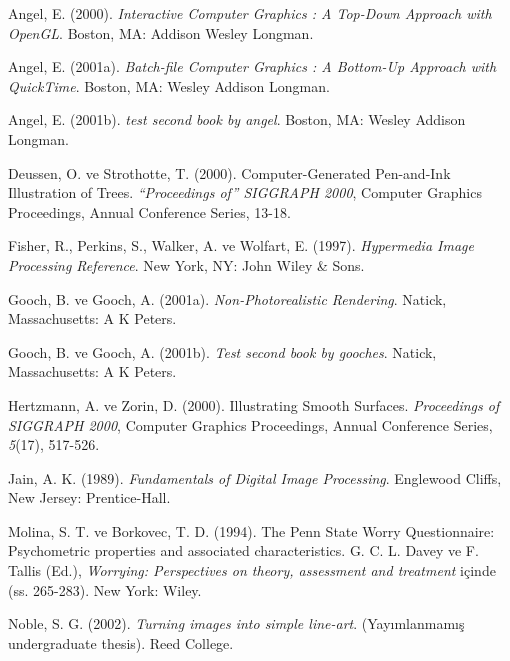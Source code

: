 \documentclass[12pt,twoside]{deuthesis}
\begin{document}
\hypertarget{refs}{}
\begin{CSLReferences}{1}{0}
\leavevmode{}%
Angel, E. (2000). \emph{Interactive Computer Graphics : A Top-Down Approach with OpenGL}. Boston, MA: Addison Wesley Longman.

\leavevmode{}%
Angel, E. (2001a). \emph{Batch-file Computer Graphics : A Bottom-Up Approach with QuickTime}. Boston, MA: Wesley Addison Longman.

\leavevmode{}%
Angel, E. (2001b). \emph{test second book by angel}. Boston, MA: Wesley Addison Longman.

\leavevmode{}%
Deussen, O. ve Strothotte, T. (2000). Computer-Generated Pen-and-Ink Illustration of Trees. \emph{{``Proceedings of''} SIGGRAPH 2000}, Computer Graphics Proceedings, Annual Conference Series, 13-18.

\leavevmode{}%
Fisher, R., Perkins, S., Walker, A. ve Wolfart, E. (1997). \emph{Hypermedia Image Processing Reference}. New York, NY: John Wiley \& Sons.

\leavevmode{}%
Gooch, B. ve Gooch, A. (2001a). \emph{{Non-Photorealistic Rendering}}. Natick, Massachusetts: A K Peters.

\leavevmode{}%
Gooch, B. ve Gooch, A. (2001b). \emph{Test second book by gooches}. Natick, Massachusetts: A K Peters.

\leavevmode{}%
Hertzmann, A. ve Zorin, D. (2000). Illustrating Smooth Surfaces. \emph{Proceedings of SIGGRAPH 2000}, Computer Graphics Proceedings, Annual Conference Series, \emph{5}(17), 517-526.

\leavevmode{}%
Jain, A. K. (1989). \emph{Fundamentals of Digital Image Processing}. Englewood Cliffs, New Jersey: Prentice-Hall.

\leavevmode{}%
Molina, S. T. ve Borkovec, T. D. (1994). The {P}enn {S}tate Worry Questionnaire: Psychometric properties and associated characteristics. G. C. L. Davey ve F. Tallis (Ed.), \emph{Worrying: Perspectives on theory, assessment and treatment} içinde (ss. 265-283). New York: Wiley.

\leavevmode{}%
Noble, S. G. (2002). \emph{Turning images into simple line-art}. (Yayımlanmamış undergraduate thesis). Reed College.


\end{CSLReferences}
\end{document}
